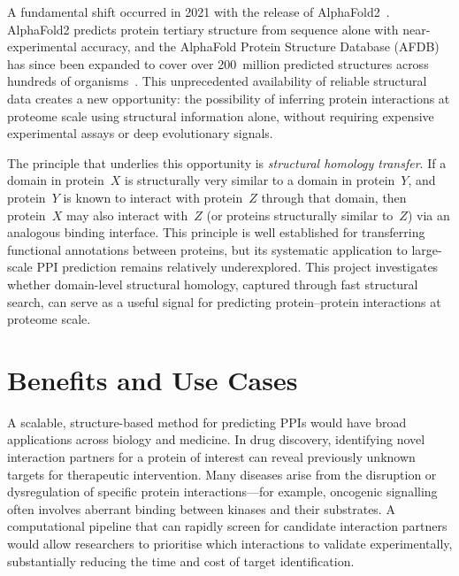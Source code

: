 A fundamental shift occurred in 2021 with the release of AlphaFold2~\cite{alphafold2}.
AlphaFold2 predicts protein tertiary structure from sequence alone with near-experimental accuracy, and the AlphaFold Protein Structure Database (AFDB) has since been expanded to cover over 200~million predicted structures across hundreds of organisms~\cite{ted_dataset}.
This unprecedented availability of reliable structural data creates a new opportunity: the possibility of inferring protein interactions at proteome scale using structural information alone, without requiring expensive experimental assays or deep evolutionary signals.

The principle that underlies this opportunity is \emph{structural homology transfer}.
If a domain in protein~$X$ is structurally very similar to a domain in protein~$Y$, and protein~$Y$ is known to interact with protein~$Z$ through that domain, then protein~$X$ may also interact with~$Z$ (or proteins structurally similar to~$Z$) via an analogous binding interface.
This principle is well established for transferring functional annotations between proteins, but its systematic application to large-scale PPI prediction remains relatively underexplored.
This project investigates whether domain-level structural homology, captured through fast structural search, can serve as a useful signal for predicting protein--protein interactions at proteome scale.


\section{Benefits and Use Cases}
\label{sec:benefits}

A scalable, structure-based method for predicting PPIs would have broad applications across biology and medicine.
In drug discovery, identifying novel interaction partners for a protein of interest can reveal previously unknown targets for therapeutic intervention.
Many diseases arise from the disruption or dysregulation of specific protein interactions---for example, oncogenic signalling often involves aberrant binding between kinases and their substrates.
A computational pipeline that can rapidly screen for candidate interaction partners would allow researchers to prioritise which interactions to validate experimentally, substantially reducing the time and cost of target identification.

